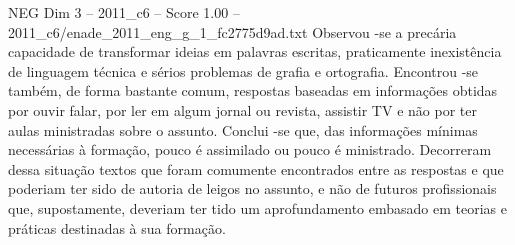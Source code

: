 \begin{textsample}{NEG Dim 3 – 2011\_c6 – Score 1.00 – 2011\_c6/enade\_2011\_eng\_g\_1\_fc2775d9ad.txt}
Observou -se a precária capacidade de transformar ideias em palavras escritas, praticamente inexistência de linguagem técnica e sérios problemas de grafia e ortografia.
Encontrou -se também, de forma bastante comum, respostas baseadas em informações obtidas por ouvir falar, por ler em algum jornal ou revista, assistir TV e não por ter aulas ministradas sobre o assunto.
Conclui -se que, das informações mínimas necessárias à formação, pouco é assimilado ou pouco é ministrado.
Decorreram dessa situação textos que foram comumente encontrados entre as respostas e que poderiam ter sido de autoria de leigos no assunto, e não de futuros profissionais que, supostamente, deveriam ter tido um aprofundamento embasado em teorias e práticas destinadas à sua formação.

\end{textsample}
